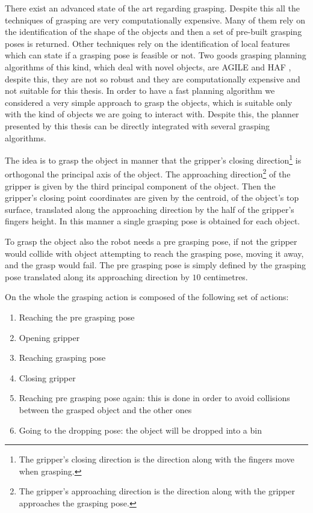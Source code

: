 There exist an advanced state of the art regarding grasping. Despite this all the techniques of grasping are very computationally expensive. Many of them rely on the identification of the shape of the objects and then a set of pre-built grasping poses is returned\citep{brook2011collaborative}. Other techniques rely on the identification of local features which can state if a grasping pose is feasible or not. Two goods grasping planning algorithms of this kind, which deal with novel objects, are AGILE \citep{AGILE} and HAF \citep{haf}, despite this, they are not so robust and they are computationally expensive and not suitable for this thesis\citep{covallero}. In order to have a fast planning algorithm we considered a very simple approach to grasp the objects, which is suitable only with the kind of objects we are going to interact with. Despite this, the planner presented by this thesis can be directly integrated with several grasping algorithms. 

The idea is to grasp the object in manner that the gripper's closing direction\footnote{The gripper's closing direction is the direction along with the fingers move when grasping.} is orthogonal the principal axis of the object. The approaching direction\footnote{The gripper's approaching direction is the direction along with the gripper approaches the grasping pose.} of the gripper is given by the third principal component of the object. Then the gripper's closing point coordinates are given by the centroid, of the object's top surface, translated along the approaching direction by the half of the gripper's fingers height.
In this manner a single grasping pose is obtained for each object. 

To grasp the object also the robot needs a pre grasping pose, if not the gripper would collide with object attempting to reach the grasping pose, moving it away, and the grasp would fail. The pre grasping pose is simply defined by the grasping pose translated along its approaching direction by $10$ centimetres.

On the whole the grasping action is composed of the following set of actions: 
\begin{enumerate}
\item Reaching the pre grasping pose
\item Opening gripper
\item Reaching grasping pose
\item Closing gripper
\item Reaching pre grasping pose again: this is done in order to avoid collisions between the grasped object and the other ones
\item Going to the dropping pose: the object will be dropped into a bin
\end{enumerate}

